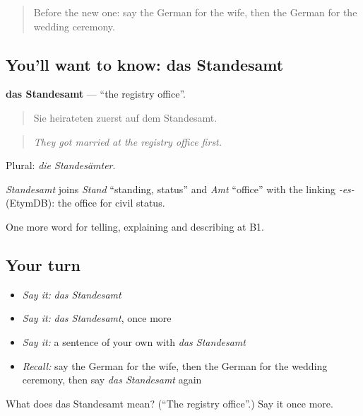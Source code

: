\label{lesson:GE-C299-standesamt}



\begin{quote}
Before the new one: say the German for the wife, then the German for the wedding ceremony.
\end{quote}

\subsection*{You'll want to know: das Standesamt}
\textbf{das Standesamt} — \textquotedblleft{}the registry office\textquotedblright{}.

\begin{quote}
Sie heirateten zuerst auf dem Standesamt.
\end{quote}

\begin{quote}
\emph{They got married at the registry office first.}
\end{quote}

Plural: \emph{die Standesämter}.

\begin{cousinweb}
\emph{Standesamt} joins \emph{Stand} \textquotedblleft{}standing, status\textquotedblright{} and \emph{Amt} \textquotedblleft{}office\textquotedblright{} with the linking \emph{-es-} (EtymDB): the office for civil status.
\end{cousinweb}

\begin{grammarlens}[title={What you've built}]
One more word for telling, explaining and describing at B1.
\end{grammarlens}

\subsection*{Your turn}
\begin{itemize}
\raggedright
  \item \emph{Say it:} \emph{das Standesamt}
  \item \emph{Say it:} \emph{das Standesamt}, once more
  \item \emph{Say it:} a sentence of your own with \emph{das Standesamt}
  \item \emph{Recall:} say the German for the wife, then the German for the wedding ceremony, then say \emph{das Standesamt} again
\end{itemize}

\begin{tcolorbox}[breakable,colback=teal!4,colframe=teal!35!black,title={Before you move on}]
What does das Standesamt mean? (\textquotedblleft{}The registry office\textquotedblright{}.) Say it once more.
\end{tcolorbox}
